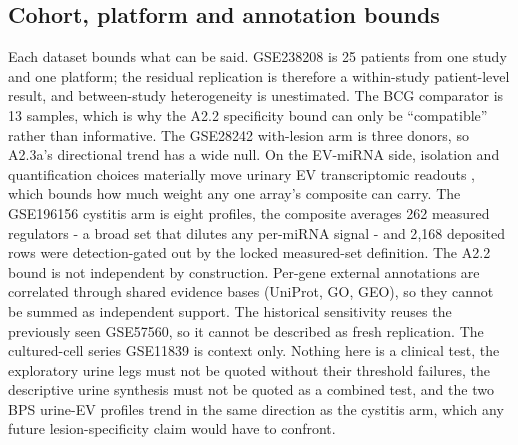 \documentclass[11pt,a4paper]{article}
\begin{document}
\subsection{Cohort, platform and annotation bounds}
Each dataset bounds what can be said. GSE238208 is 25 patients from one study
and one platform; the residual replication is therefore a within-study
patient-level result, and between-study heterogeneity is unestimated. The BCG
comparator is 13 samples, which is why the A2.2 specificity bound can only be
``compatible'' rather than informative. The GSE28242 with-lesion arm is three
donors, so A2.3a's directional trend has a wide null. On the EV-miRNA side,
isolation and quantification choices materially move urinary EV transcriptomic
readouts \cite{barreiro2020}, which bounds how much weight any one array's
composite can carry. The GSE196156 cystitis
arm is eight profiles, the composite averages 262 measured regulators - a broad
set that dilutes any per-miRNA signal - and 2{,}168 deposited rows were
detection-gated out by the locked measured-set definition. The A2.2 bound is
not independent by construction. Per-gene external annotations are correlated
through shared evidence bases (UniProt, GO, GEO), so they cannot be summed as
independent support. The historical sensitivity reuses the previously seen
GSE57560, so it cannot be described as fresh replication. The cultured-cell
series GSE11839 is context only. Nothing here is a clinical test, the
exploratory urine legs must not be quoted without their threshold failures,
the descriptive urine synthesis must not be quoted as a combined test, and the
two BPS urine-EV profiles trend in the same direction as the cystitis arm,
which any future lesion-specificity claim would have to confront.
\end{document}
